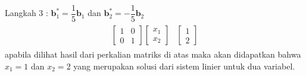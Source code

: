 \documentclass{article}   %
\begin{document}
	Langkah 3 : $\textbf{b}^*_1= \dfrac{1}{5}\textbf{b}_1 $ dan $\textbf{b}^*_2= -\dfrac{1}{5}\textbf{b}_2$ \\
	\begin{align*}
	\begin{array}{r|r} 
		\left[
		\begin{array}{rr} 
			1 & 0 \\
			0 & 1 
		\end{array} 
		\right] \left[
		\begin{array}{r} 
			x_1 \\ 
			x_2  
		\end{array}
		\right]  &  \left[
		\begin{array}{r} 
			1\\
			2 
		\end{array} 
		\right]
	\end{array}
\end{align*}
	apabila dilihat hasil dari perkalian matriks di atas maka akan didapatkan bahwa $x_1=1$ dan $x_2=2$ yang merupakan solusi dari sistem linier untuk dua variabel.\\
	
\end{document}
